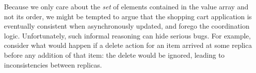 
Because we only care about the \emph{set} of elements contained in the value array
and not its order, we might be tempted to argue that 
the shopping cart application is eventually consistent
when asynchronously updated, and forego the coordination logic.  Unfortunately,
such informal reasoning can hide serious bugs. For example, consider what would happen if a delete action for an item arrived at some replica
before any addition of that item: the delete would be ignored, leading to
inconsistencies between replicas.

